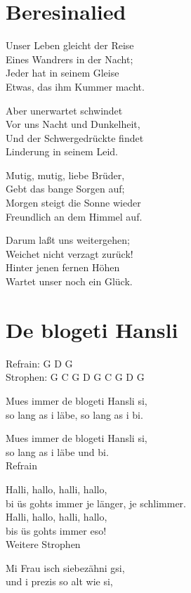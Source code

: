 \documentclass[
  letterpaper,
]{scrbook}
\begin{document}
\hypertarget{beresinalied}{%
\chapter{Beresinalied}\label{beresinalied}}

Unser Leben gleicht der Reise\\
Eines Wandrers in der Nacht;\\
Jeder hat in seinem Gleise\\
Etwas, das ihm Kummer macht.

Aber unerwartet schwindet\\
Vor uns Nacht und Dunkelheit,\\
Und der Schwergedrückte findet\\
Linderung in seinem Leid.

Mutig, mutig, liebe Brüder,\\
Gebt das bange Sorgen auf;\\
Morgen steigt die Sonne wieder\\
Freundlich an dem Himmel auf.

Darum laßt uns weitergehen;\\
Weichet nicht verzagt zurück!\\
Hinter jenen fernen Höhen\\
Wartet unser noch ein Glück.

\hypertarget{de-blogeti-hansli}{%
\chapter{De blogeti Hansli}\label{de-blogeti-hansli}}

Refrain: G D G\\
Strophen: G C G D G C G D G

Mues immer de blogeti Hansli si,\\
so lang as i läbe, so lang as i bi.

Mues immer de blogeti Hansli si,\\
so lang as i läbe und bi.\\
Refrain

Halli, hallo, halli, hallo,\\
bi üs gohts immer je länger, je schlimmer.\\
Halli, hallo, halli, hallo,\\
bis üs gohts immer eso!\\
Weitere Strophen

Mi Frau isch siebezähni gsi,\\
und i prezis so alt wie si,
\end{document}
